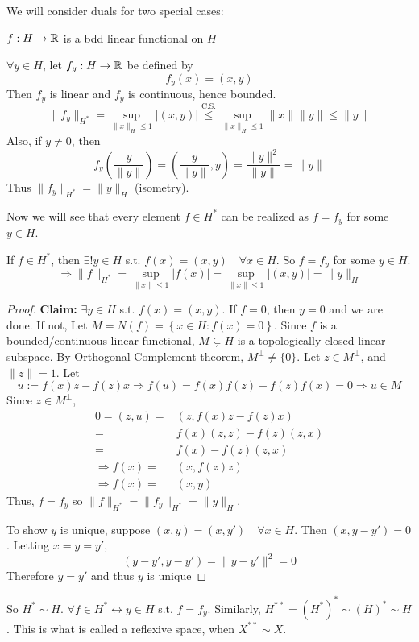 We will consider duals for two special cases:
\begin{exmp}
    $f : H \to \mathbb{R}$ is a bdd linear functional on $H$
    
    $\forall y \in H$, let $f_y : H \to \mathbb{R} $ be defined by 
    \[
        f_y(x) = (x, y)
    \]
    Then $f_y$ is linear and $f_y$ is continuous, hence bounded. 
    \[
        \| f_y \|_{H^*} = \sup_{\| x \|_H \leq 1 } |(x, y)| 
        \stackrel{\text{C.S.}}{\leq} \sup_{\| x \|_H \leq 1 } \| x \| \| y \| \leq \| y \|  
    \] 
    Also, if $y \neq 0$, then 
    \[
        f_y(\frac{y}{\| y \| }) = (\frac{y}{\| y \| }, y) = \frac{\| y \|^2 }{\| y \| } = \| y \| 
    \]   
    Thus $\| f_y \|_{H^*} = \| y \|_H $ (isometry).
    
    Now we will see that every element $f \in H^*$ can be realized as $f = f_y$ for some $y \in H$.   
\end{exmp}

\begin{thm}
    If $f \in H^*$, then $\exists ! y \in H$ s.t. $f(x) = (x, y) \quad \forall x \in H$.
    So $f = f_y$ for some $y \in H$.
    \[
        \Rightarrow \| f \|_{H^*} = \sup_{\| x \|\leq 1 } |f(x)| = \sup_{ \| x  \| \leq 1 } |(x, y)| =
        \| y \|_H  
    \]       
\end{thm}
\begin{proof}
    \textbf{Claim:} $\exists y \in H$ s.t. $f(x) = (x, y)$.
    \newline \noindent If $f = 0$, then $y = 0$ and we are done. If not,
    Let $M = N(f) = \left\{ x \in H  : f(x)= 0\right\} $. Since $f$ is a bounded/continuous
    linear functional, $M \subsetneq H$ is a topologically closed linear subspace. By 
    Orthogonal Complement theorem, $M^\perp \neq \{0\}$. Let $z \in M^\perp$, and $\| z \| = 1 $.
    Let
    \[
        u := f(x)z - f(z)x \Rightarrow f(u) = f(x)f(z) - f(z)f(x) = 0 \Rightarrow u \in M
    \] 
    Since $z \in M^\perp$, 
    \begin{align*}
        0 = (z, u) =& (z, f(x)z - f(z)x) \\
        =& f(x)(z, z) - f(z)(z, x) \\
        =& f(x) - f(z)(z, x) \\
        \Rightarrow f(x) =& (x, f(z)z) \\
        \Rightarrow f(x) =& (x, y) 
    \end{align*} 
    Thus, $f = f_y$ so $\| f \|_{H^*} = \| f_y \|_{H^*} = \| y \|_H$.
    
    To show $y$ is unique, suppose $(x, y) = (x, y') \quad \forall x \in H$. Then
    $(x, y- y') = 0$. Letting $x = y = y'$, \[
        (y - y', y- y') = \| y - y' \|^2 = 0 
    \]   
    Therefore $ y = y'$ and thus $y$ is unique  
\end{proof}
\begin{rem}
    So $H^* \sim H$. 
    $\forall f \in H^* \longleftrightarrow y \in H$ s.t. $f = f_y$.
    Similarly, $H^{**} = (H^*)^* \sim (H)^* \sim H$.
    This is what is called a reflexive space, when $X^{**} \sim X$. 
\end{rem}

